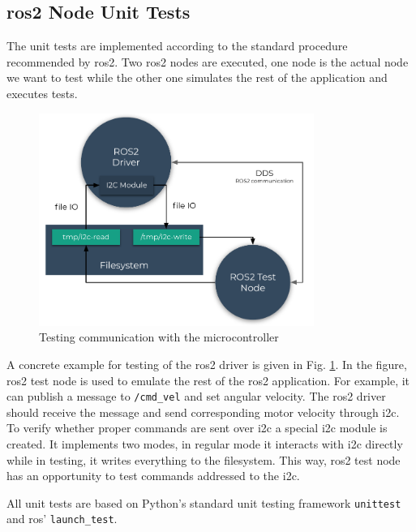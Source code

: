 \subsection{\ac{ros2} Node Unit Tests}

The unit tests are implemented according to the standard procedure recommended by \ac{ros2}. Two \ac{ros2} nodes are executed, one node is the actual node we want to test while the other one simulates the rest of the application and executes tests. 

\begin{figure}[H]
    \centering
    \includegraphics[width=0.8\textwidth]{physical/figures/mocking.pdf}
    \caption{Testing communication with the microcontroller}
    \label{fig:physical:mocking}
\end{figure}

A concrete example for testing of the \ac{ros2} driver is given in Fig. \ref{fig:physical:mocking}. In the figure, \ac{ros2} test node is used to emulate the rest of the \ac{ros2} application. For example, it can publish a message to \texttt{/cmd\_vel} and set angular velocity.
The \ac{ros2} driver should receive the message and send corresponding motor velocity through \ac{i2c}. To verify whether proper commands are sent over \ac{i2c} a special \ac{i2c} module is created.
It implements two modes, in regular mode it interacts with \ac{i2c} directly while in testing, it writes everything to the filesystem. 
This way, \ac{ros2} test node has an opportunity to test commands addressed to the \ac{i2c}.

All unit tests are based on Python's standard unit testing framework \texttt{unittest} and \ac{ros}' \texttt{launch\_test}.

